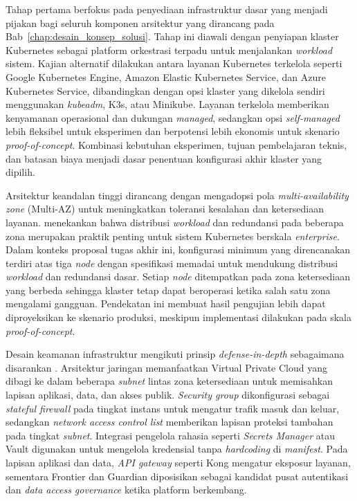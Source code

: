 Tahap pertama berfokus pada penyediaan infrastruktur dasar yang menjadi pijakan bagi seluruh komponen arsitektur yang dirancang pada Bab~\ref{chap:desain_konsep_solusi}. Tahap ini diawali dengan penyiapan klaster Kubernetes sebagai platform orkestrasi terpadu untuk menjalankan \textit{workload} sistem. Kajian alternatif dilakukan antara layanan Kubernetes terkelola seperti Google Kubernetes Engine, Amazon Elastic Kubernetes Service, dan Azure Kubernetes Service, dibandingkan dengan opsi klaster yang dikelola sendiri menggunakan \textit{kubeadm}, K3s, atau Minikube. Layanan terkelola memberikan kenyamanan operasional dan dukungan \textit{managed}, sedangkan opsi \textit{self-managed} lebih fleksibel untuk eksperimen dan berpotensi lebih ekonomis untuk skenario \textit{proof-of-concept}. Kombinasi kebutuhan eksperimen, tujuan pembelajaran teknis, dan batasan biaya menjadi dasar penentuan konfigurasi akhir klaster yang dipilih.

Arsitektur keandalan tinggi dirancang dengan mengadopsi pola \textit{multi-availability zone} (Multi-AZ) untuk meningkatkan toleransi kesalahan dan ketersediaan layanan. \textcite{lakka2025kubernetes} menekankan bahwa distribusi \textit{workload} dan redundansi pada beberapa zona merupakan praktik penting untuk sistem Kubernetes berskala \textit{enterprise}. Dalam konteks proposal tugas akhir ini, konfigurasi minimum yang direncanakan terdiri atas tiga \textit{node} dengan spesifikasi memadai untuk mendukung distribusi \textit{workload} dan redundansi dasar. Setiap \textit{node} ditempatkan pada zona ketersediaan yang berbeda sehingga klaster tetap dapat beroperasi ketika salah satu zona mengalami gangguan. Pendekatan ini membuat hasil pengujian lebih dapat diproyeksikan ke skenario produksi, meskipun implementasi dilakukan pada skala \textit{proof-of-concept}.

Desain keamanan infrastruktur mengikuti prinsip \textit{defense-in-depth} sebagaimana disarankan \textcite{ahmad2024mlops}. Arsitektur jaringan memanfaatkan Virtual Private Cloud yang dibagi ke dalam beberapa \textit{subnet} lintas zona ketersediaan untuk memisahkan lapisan aplikasi, data, dan akses publik. \textit{Security group} dikonfigurasi sebagai \textit{stateful firewall} pada tingkat instans untuk mengatur trafik masuk dan keluar, sedangkan \textit{network access control list} memberikan lapisan proteksi tambahan pada tingkat \textit{subnet}. Integrasi pengelola rahasia seperti \textit{Secrets Manager} atau Vault digunakan untuk mengelola kredensial tanpa \textit{hardcoding} di \textit{manifest}. Pada lapisan aplikasi dan data, \textit{API gateway} seperti Kong mengatur eksposur layanan, sementara Frontier dan Guardian diposisikan sebagai kandidat pusat autentikasi dan \textit{data access governance} ketika platform berkembang.

